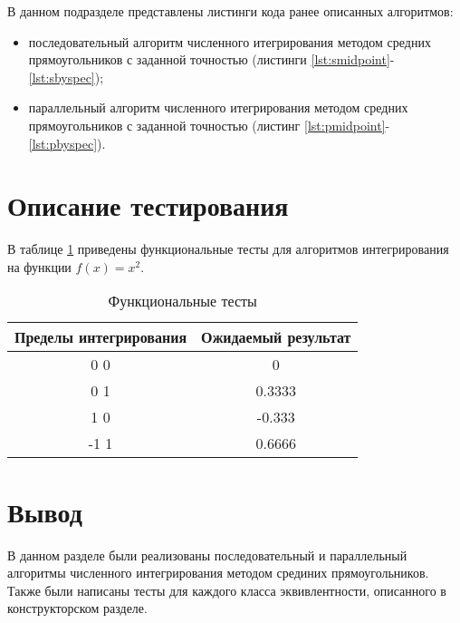 В данном подразделе представлены листинги кода ранее описанных алгоритмов:
\begin{itemize}[left=\parindent]
    \item последовательный алгоритм численного итегрирования методом средних
        прямоугольников с заданной точностью (листинги
        \ref{lst:smidpoint}-\ref{lst:sbyspec});
    \item параллельный алгоритм численного итегрирования методом средних
        прямоугольников с заданной точностью (листинг
        \ref{lst:pmidpoint}-\ref{lst:pbyspec}).
\end{itemize}






\section{Описание тестирования}

В таблице \ref{tab:tests} приведены функциональные тесты для алгоритмов
интегрирования на функции $f(x) = x^2$.

\begin{table}[h!]
	\begin{center}
    \begin{threeparttable}
        \captionsetup{justification=raggedright,singlelinecheck=off}
        \caption{\label{tab:tests}Функциональные тесты}
        \begin{tabular}{|c|c|}
			\hline
            \textbf{Пределы интегрирования} & \textbf{Ожидаемый результат} \\ [2mm]
            \hline
            0 0
            &
            0
            \\
            \hline
            0 1
            &
            0.3333
            \\
            \hline
            1 0
            &
            -0.333
            \\
            \hline
            -1 1
            &
            0.6666
            \\
            \hline
		\end{tabular}
    \end{threeparttable} 
	\end{center}
\end{table}

\section{Вывод}

В данном разделе были реализованы последовательный и параллельный алгоритмы
численного интегрирования методом срединих прямоугольников. Также были написаны
тесты для каждого класса эквивлентности, описанного в конструкторском разделе.
